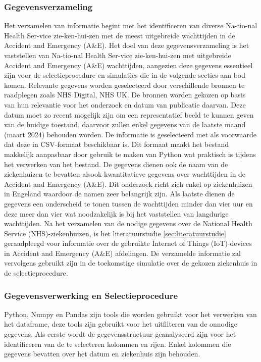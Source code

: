 
\subsubsection*{Gegevensverzameling}
Het verzamelen van informatie begint met het identificeren van diverse Na-tio-nal Health Ser-vice zie-ken-hui-zen
met de meest uitgebreide wachttijden in de Accident and Emergency (A\&E). Het doel van deze gegevensverzameling is het vaststellen van Na-tio-nal Health Ser-vice zie-ken-hui-zen met uitgebreide Accident and Emergency (A\&E) wachttijden, aangezien deze gegevens essentieel zijn voor de selectieprocedure en simulaties die in de volgende secties aan bod komen. Relevante gegevens worden geselecteerd door verschillende bronnen te raadplegen zoals NHS Digital, NHS UK. De bronnen worden gekozen op basis van hun relevantie voor het onderzoek en datum van publicatie daarvan. Deze datum moet zo recent mogelijk zijn om een representatief beeld te kunnen geven van de huidige toestand, daarvoor zullen enkel gegevens van de laatste maand (maart 2024) behouden worden. De informatie is geselecteerd met als voorwaarde dat deze in CSV-formaat beschikbaar is. Dit formaat maakt het bestand makkelijk aanpasbaar door gebruik te maken van Python wat praktisch is tijdens het verwerken van het bestand. De gegevens dienen ook de naam van de ziekenhuizen te bevatten alsook kwantitatieve gegevens over wachttijden in de Accident and Emergency (A\&E). Dit onderzoek richt zich enkel op ziekenhuizen in Engeland waardoor de namen zeer belangrijk zijn. Als laatste dienen de gegevens een onderscheid te tonen tussen de wachttijden minder dan vier uur en deze meer dan vier wat noodzakelijk is bij het vaststellen van langdurige wachttijden. Na het verzamelen van de nodige gegevens over de National Health Service (NHS)-ziekenhuizen, is het literatuurstudie \ref{sec:literatuurstudie} geraadpleegd voor informatie over de gebruikte Internet of Things (IoT)-devices in Accident and Emergency (A\&E) afdelingen. De verzamelde informatie zal vervolgens gebruikt zijn in de toekomstige simulatie over de gekozen ziekenhuis in de selectieprocedure.

\subsubsection*{Gegevensverwerking en Selectieprocedure}
Python, Numpy en Pandas zijn tools die worden gebruikt voor het verwerken van het dataframe, deze tools zijn gebruikt voor het uitfilteren van de onnodige gegevens. Als eerste wordt de gegevensstructuur geanalyseerd zijn voor het identificeren van de te selecteren kolommen en rijen. Enkel kolommen die gegevens bevatten over het datum en ziekenhuis zijn behouden.

